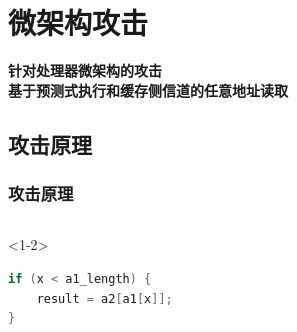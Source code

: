 \documentclass[presentation,aspectratio=169]{beamer}
\begin{document}
\section{微架构攻击}

\begin{frame}{}
    \centering
    \Huge\bfseries\textcolor{xmucolor}{针对处理器微架构的攻击}\\
    \vspace{1em}
    \large\bfseries\textcolor{xmucolor}{基于预测式执行和缓存侧信道的任意地址读取}
\end{frame}

\subsection{攻击原理}
\begin{frame}[fragile]
\frametitle{攻击原理}
\begin{columns}[c]

    \begin{onlyenv}<1-2>
    
    \begin{lstlisting}[language=c]
if (x < a1_length) {
    result = a2[a1[x]];
}
    \end{lstlisting}
    \end{onlyenv}


    


\end{columns}
\end{frame}
\end{document}

